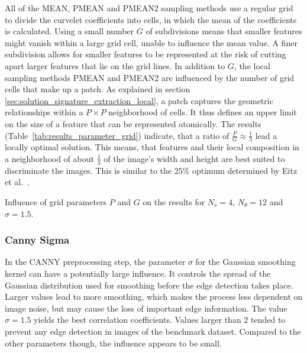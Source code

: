 All of the MEAN, PMEAN and PMEAN2 sampling methods use a regular grid to divide
the curvelet coefficients into cells, in which the mean of the coefficients is
calculated. Using a small number $G$ of subdivisions means that smaller
features might vanish within a large grid cell, unable to influence the mean
value. A finer subdivision allows for smaller features to be represented at the
risk of cutting apart larger features that lie on the grid lines. In addition
to $G$, the local sampling methods PMEAN and PMEAN2 are influenced by the
number of grid cells that make up a patch. As explained in section
\ref{sec:solution_signature_extraction_local}, a patch captures the geometric
relationships within a $P \times P$ neighborhood of cells. It thus defines an
upper limit on the size of a feature that can be represented atomically. The
results (Table~\ref{tab:results_parameter_grid}) indicate, that a ratio of
$\frac{P}{G} \approx \frac{1}{3}$ lead a locally optimal solution. This means,
that features and their local composition in a neighborhood of about
$\frac{1}{3}$ of the image's width and height are best suited to discriminate
the images. This is similar to the $25\%$ optimum determined by Eitz et al.\
\autocite{eitz_sketch-based_2010}.

\begin{table}[h]
    \centering
    \resultsparametergrid
    \caption[Grid Size Parameter Results]{
        Influence of grid parameters $P$ and $G$ on the results for $N_s=4$,
        $N_{\theta}=12$ and $\sigma=1.5$.
    }
    \label{tab:results_parameter_grid}
\end{table}

\FloatBarrier
\subsubsection{Canny Sigma}

In the CANNY preprocessing step, the parameter $\sigma$ for the Gaussian
smoothing kernel can have a potentially large influence. It controls the spread
of the Gaussian distribution used for smoothing before the edge detection takes
place. Larger values lead to more smoothing, which makes the process less
dependent on image noise, but may cause the loss of important edge information.
The value $\sigma = 1.5$ yields the best correlation coefficients. Values
larger than $2$ tended to prevent any edge detection in images of the benchmark
dataset. Compared to the other parameters though, the influence appears to be
small.

